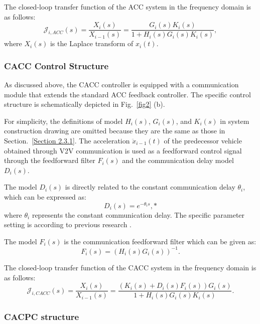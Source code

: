 \documentclass[trsc,nonblindrev]{informs3} %
\begin{document}
The closed-loop transfer function of the ACC system in the frequency domain is as follows:
\begin{equation}
    \mathcal{J}_{i, A C C}(s)=\frac{X_{i}(s)}{X_{i-1}(s)}=\frac{G_{i}(s) K_{i}(s)}{1+H_{i}(s) G_{i}(s) K_{i}(s)},
\end{equation}
where $X_i (s)$ is the Laplace transform of $x_i (t)$.

\subsubsection{CACC Control Structure}
\label{Section 2.3.2}

As discussed above, the CACC controller is equipped with a communication module that extends the standard ACC feedback controller. The specific control structure is schematically depicted in Fig.~\ref{fig2} (b).

For simplicity, the definitions of model $H_i(s)$, $G_i(s)$, and $K_i(s)$ in system construction drawing are omitted because they are the same as those in Section.~\ref{Section 2.3.1}. The acceleration $\ddot{x}_{i-1}(t)$ of the predecessor vehicle obtained through V2V communication is used as a feedforward control signal through the feedforward filter $F_i(s)$ and the communication delay model $D_i(s)$.

The model $D_i(s)$ is directly related to the constant communication delay $\theta_i$, which can be expressed as:
\begin{equation}
    D_{i}(s)=e^{-\theta_{i} s},*
\end{equation}
where $\theta_i$ represents the constant communication delay. The specific parameter setting is according to previous research \citep{navas2016using,zhang2020control}.

The model $F_i(s)$ is the communication feedforward filter which can be given as:
\begin{equation}
    F_{i}(s)=\left(H_{i}(s) G_{i}(s)\right)^{-1}.
\end{equation}

The closed-loop transfer function of the CACC system in the frequency domain is as follows:
\begin{equation}
    \mathcal{J}_{i, C A C C}(s)=\frac{X_{i}(s)}{X_{i-1}(s)}=\frac{\left(K_{i}(s)+D_{i}(s) F_{i}(s)\right) G_{i}(s)}{1+H_{i}(s) G_{i}(s) K_{i}(s)}.
\end{equation}

\subsubsection{CACPC structure}
\label{Section 2.3.3}
\end{document}
